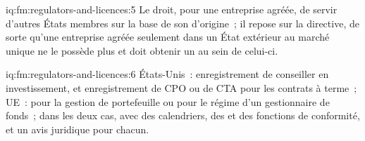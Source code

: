 \begin{solution}{iq:fm:regulators-and-licences:5}
Le droit, pour une entreprise agréée, de servir d'autres États membres sur la base de son  d'origine~; il repose sur la directive, de sorte qu'une entreprise agréée seulement dans un
État extérieur au marché unique ne le possède plus et doit obtenir un  au sein de celui-ci.
\end{solution}

\begin{solution}{iq:fm:regulators-and-licences:6}
États-Unis~: enregistrement de conseiller en investissement, et enregistrement de CPO ou de CTA pour les contrats à terme~; UE~:  pour la gestion de portefeuille ou pour le
régime d'un gestionnaire de fonds~; dans les deux cas, avec des calendriers, des  et des fonctions de conformité, et un avis juridique pour chacun.
\end{solution}
